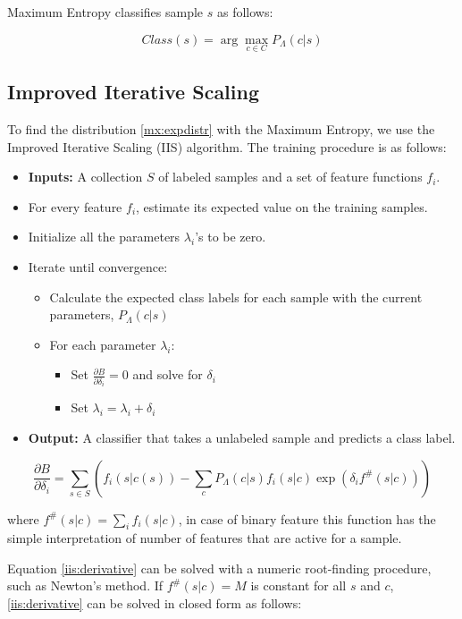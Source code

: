 \documentclass{report}
\begin{document}
Maximum Entropy classifies sample $s$ as follows:

\[
Class(s)  = \arg \max_{c \in C} P_{\Lambda}(c|s)
\]

\subsection{Improved Iterative Scaling}

To find the distribution \ref{mx:expdistr} with the Maximum Entropy, we use the Improved Iterative Scaling (IIS) \cite{berger:gental} algorithm. The training procedure is as follows:

\begin{itemize}
	\item \textbf{Inputs:} A collection $S$ of labeled samples and a set of feature functions $f_i$.
	\item For every feature $f_i$, estimate its expected value on the training samples.
	\item Initialize all the parameters $\lambda_i$'s to be zero.
	\item Iterate until convergence:
	\begin{itemize}
		\item Calculate the expected class labels for each sample with the current parameters, $P_{\Lambda}(c|s)$
		\item For each parameter $\lambda_i$:
		\begin{itemize}
			\item Set $\frac{\partial B}{\partial \delta_i}  = 0$ and solve for $\delta_i$
			\item Set $\lambda_i = \lambda_i + \delta_i$
		\end{itemize}
	\end{itemize}
	\item \textbf{Output:} A classifier that takes a unlabeled sample and predicts a class label.
\end{itemize}

\begin{equation}
\label{iis:derivative}
\frac{\partial B}{\partial \delta_i} = \sum_{s \in S} (f_i (s|c(s)) - \sum_c P_{\Lambda}(c|s) f_i(s|c) \exp(\delta_i f^{\#}(s|c)))
\end{equation}

where $f^{\#}(s|c) = \sum_i f_i (s|c)$, in case of binary feature this function has the simple interpretation of number of features that are active for a sample.

Equation \ref{iis:derivative} can be solved with a numeric root-finding procedure, such as Newton’s method. If $f^{\#}(s|c) = M$ is constant for all $s$ and $c$, \ref{iis:derivative} can be solved in closed form as follows:
\end{document}
